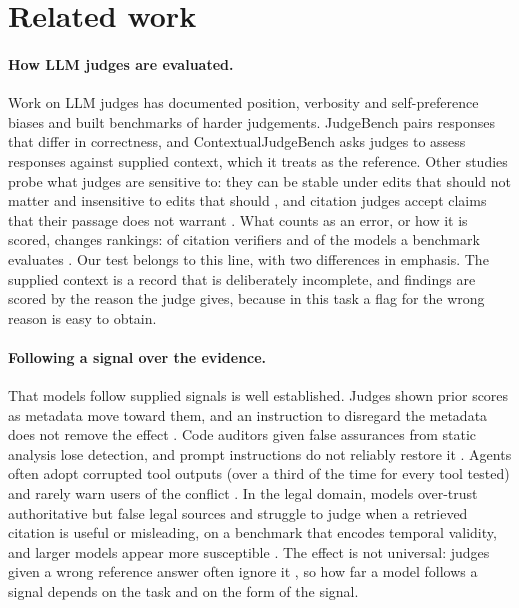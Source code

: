 \section{Related work}
\label{sec:related}

\paragraph{How LLM judges are evaluated.}
Work on LLM judges has documented position, verbosity and self-preference biases \citep{zheng2023judging} and built
benchmarks of harder judgements. JudgeBench \citep{tan2025judgebench} pairs responses that differ in correctness, and
ContextualJudgeBench \citep{xu2025contextualjudgebench} asks judges to assess responses against supplied context,
which it treats as the reference. Other studies probe what judges are sensitive to: they can be stable under edits
that should not matter and insensitive to edits that should \citep{chen2026judgeknow}, and citation judges accept
claims that their passage does not warrant \citep{qian2026relevant}. What counts as an error, or how it is
scored, changes rankings: of citation verifiers \citep{kim2026hallmark} and of the models a benchmark evaluates
\citep{pall2026scoring}. Our test belongs to this line, with two
differences in emphasis. The supplied context is a record that is deliberately incomplete, and findings are scored by
the reason the judge gives, because in this task a flag for the wrong reason is easy to obtain.

\paragraph{Following a signal over the evidence.}
That models follow supplied signals is well established. Judges shown prior scores as metadata move toward them, and
an instruction to disregard the metadata does not remove the effect \citep{kapetanovic2026anchoring}. Code auditors
given false assurances from static analysis lose detection, and prompt instructions do not reliably restore it
\citep{liu2026trusting}. Agents often adopt corrupted tool outputs (over a third of the time for every
tool tested) and rarely warn users of the conflict \citep{yang2026overreliance}. In the legal domain, models over-trust authoritative but false legal sources and struggle to judge
when a retrieved citation is useful or misleading, on a benchmark that encodes temporal validity, and larger models appear more susceptible \citep{molfetta2026sycophants}. The effect is not
universal: judges given a wrong reference answer often ignore it \citep{lee2026reference}, so how far a model follows
a signal depends on the task and on the form of the signal.

